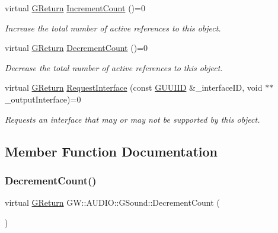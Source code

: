\begin{DoxyCompactItemize}
virtual \mbox{\hyperlink{namespace_g_w_a67a839e3df7ea8a5c5686613a7a3de21}{G\+Return}} \mbox{\hyperlink{class_g_w_1_1_a_u_d_i_o_1_1_g_sound_a33149257f0958b4db57f5508492410ad}{Increment\+Count}} ()=0
\begin{DoxyCompactList}\small\item\em Increase the total number of active references to this object. \end{DoxyCompactList}\item 
virtual \mbox{\hyperlink{namespace_g_w_a67a839e3df7ea8a5c5686613a7a3de21}{G\+Return}} \mbox{\hyperlink{class_g_w_1_1_a_u_d_i_o_1_1_g_sound_afa9587ca984fc5ad2d5cdd47c3aebbcb}{Decrement\+Count}} ()=0
\begin{DoxyCompactList}\small\item\em Decrease the total number of active references to this object. \end{DoxyCompactList}\item 
virtual \mbox{\hyperlink{namespace_g_w_a67a839e3df7ea8a5c5686613a7a3de21}{G\+Return}} \mbox{\hyperlink{class_g_w_1_1_a_u_d_i_o_1_1_g_sound_ac3c8f8dd06b71f86356a3e316fb3b4dc}{Request\+Interface}} (const \mbox{\hyperlink{struct_g_w_1_1_g_u_u_i_i_d}{G\+U\+U\+I\+ID}} \&\+\_\+interface\+ID, void $\ast$$\ast$\+\_\+output\+Interface)=0
\begin{DoxyCompactList}\small\item\em Requests an interface that may or may not be supported by this object. \end{DoxyCompactList}\end{DoxyCompactItemize}


\subsection{Member Function Documentation}
\mbox{\label{class_g_w_1_1_a_u_d_i_o_1_1_g_sound_afa9587ca984fc5ad2d5cdd47c3aebbcb}} 
\subsubsection{\texorpdfstring{Decrement\+Count()}{DecrementCount()}}
{\footnotesize\ttfamily virtual \mbox{\hyperlink{namespace_g_w_a67a839e3df7ea8a5c5686613a7a3de21}{G\+Return}} G\+W\+::\+A\+U\+D\+I\+O\+::\+G\+Sound\+::\+Decrement\+Count (\begin{DoxyParamCaption}{ }\end{DoxyParamCaption})\hspace{0.3cm}{\ttfamily [pure virtual]}}



